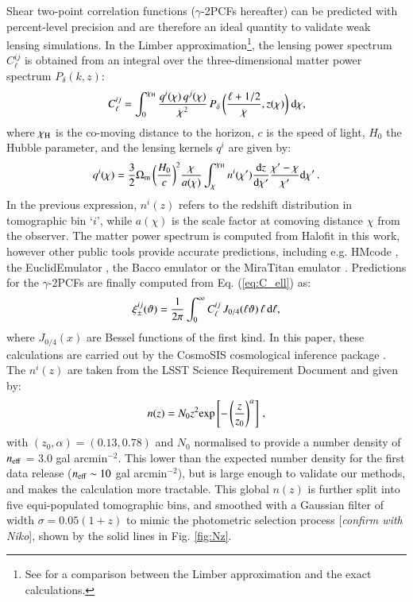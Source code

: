 \documentclass[useAMS,usenatbib]{mn2e}
\begin{document}
 Shear two-point correlation functions ($\gamma$-2PCFs hereafter) can be predicted with percent-level precision and are therefore an ideal quantity to validate weak lensing simulations. In the Limber approximation\footnote{See \citet{Kilbinger17} for a comparison between the Limber approximation and the exact calculations.}, the lensing power spectrum $C^{ij}_{\ell}$ is obtained from an integral over the three-dimensional matter power spectrum $P_{\delta}(k,z)$:
  \begin{eqnarray}
C_{\ell}^{ij} = \int_0^{\chi_{\rm H}}  \frac{q^i(\chi) \,q^j(\chi)}{\chi^2} \, P_{\delta}\, \bigg(\frac{\ell+1/2}{\chi},z(\chi)\bigg) \ {\rm d}\chi,
\label{eq:C_ell}
\end{eqnarray}
where $\chi_{\rm H}$ is the co-moving distance to the horizon, $c$ is the speed of light, $H_0$ the Hubble parameter,  and the  lensing kernels $q^{i}$ are given by:
\begin{eqnarray}
q^i(\chi) = \frac{3}{2}\Omega_{\rm m} \, \bigg(\frac{H_0}{c} \bigg)^2 \frac{\chi}{a(\chi)} \int_{\chi}^{\chi_{\rm H}} n^i(\chi')\frac{{\rm d}z}{{\rm d} \chi'}\frac{\chi' - \chi}{\chi'}{\rm d}\chi' \, .
\label{eq:q_lensing}
\end{eqnarray}
In the previous expression, $n^i(z)$ refers to the redshift distribution  in tomographic bin `$i$', while $a(\chi)$ is the scale factor at comoving distance $\chi$ from the observer.  
 The matter power spectrum is computed from  {\sc Halofit} \citep{Takahashi2012} in this work, however  other public tools provide accurate predictions, including e.g. {\sc HMcode} \citep{HMCode2020}, the {\sc EuclidEmulator} \citep{EuclidEmulator}, the {\sc Bacco} emulator \citep{BACCOEmulator} or the {\sc MiraTitan} emulator \citep{miraTitan}. 
 Predictions for the $\gamma$-2PCFs are finally computed from Eq. (\ref{eq:C_ell}) as:
 \begin{eqnarray}
\xi_{\pm}^{ij}(\vartheta) = \frac{1}{2\pi}\int_0^{\infty} C_{\ell}^{ij} \, J_{0/4}(\ell \vartheta) \, \ell \, {\rm d}\ell,
\label{eq:xipm_th}
\end{eqnarray}
where $J_{0/4}(x)$ are Bessel functions of the first kind. In this paper, these calculations are carried out by the {\sc CosmoSIS} cosmological inference package \citep{cosmoSIS}. The $n^i(z)$ are taken from the LSST Science Requirement Document \citep{LSST-SRD} and given by:
 \begin{eqnarray}
n(z) = N_0 z^2 {\rm exp} \left[-\left(\frac{z}{z_0}\right)^\alpha \right]\, ,
\label{eq:nz}
\end{eqnarray}
with $(z_0, \alpha) = (0.13, 0.78)$ and $N_0$ normalised to provide a number density of $n_{\rm eff}$ = 3.0 gal arcmin$^{-2}$. This lower than the expected number density for the first data release ($n_{\rm eff}\sim10$ gal arcmin$^{-2}$), but is large enough to validate our methods, and makes the calculation more tractable. This global $n(z)$ is further split into five equi-populated tomographic bins, and smoothed with a Gaussian filter of width $\sigma = 0.05(1+z)$ to mimic the photometric selection process [{\it confirm with Niko}], shown by the solid lines in Fig. \ref{fig:Nz}. 
\end{document}

